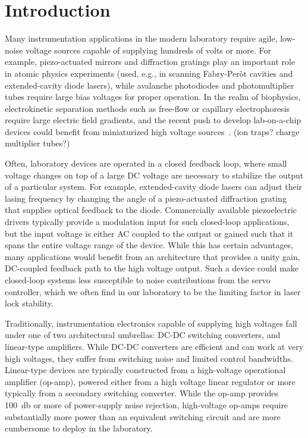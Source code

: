 \documentclass[aip,rsi,reprint]{revtex4-1} %
\begin{document}
\section{Introduction}
\label{Sec:Introduction}

Many instrumentation applications in the modern laboratory require agile, low-noise voltage sources capable of supplying hundreds of volts or more.
For example, piezo-actuated mirrors and diffraction gratings play an important role in atomic physics experiments (used, e.g., in scanning Fabry-Per{\`o}t cavities and extended-cavity diode lasers), while avalanche photodiodes and photomultiplier tubes require large bias voltages for proper operation. 
In the realm of biophysics, electrokinetic separation methods such as free-flow or capillary electrophoresis require large electric field gradients, and the recent push to develop lab-on-a-chip devices could benefit from miniaturized high voltage sources~\cite{Kohlheyer2008a}. (ion traps? charge multiplier tubes?)

Often, laboratory devices are operated in a closed feedback loop, where small voltage changes on top of a large DC voltage are necessary to stabilize the output of a particular system.
For example, extended-cavity diode lasers can adjust their lasing frequency by changing the angle of a piezo-actuated diffraction grating that supplies optical feedback to the diode.
Commercially available piezoelectric drivers typically provide a modulation input for  such closed-loop applications, but the input voltage is either AC coupled to the output or gained such that it spans the entire voltage range of the device.
While this has certain advantages, many applications would benefit from an architecture that provides a unity gain, DC-coupled feedback path to the high voltage output. 
Such a device could make closed-loop systems less susceptible to noise contributions from the servo controller, which we often find in our laboratory to be the limiting factor in laser lock stability.

Traditionally, instrumentation electronics capable of supplying high voltages fall under one of two architectural umbrellas: DC-DC switching converters, and linear-type amplifiers.
While DC-DC converters are efficient and can work at very high voltages, they suffer from switching noise and limited control bandwidths.
Linear-type devices are typically constructed from a high-voltage operational amplifier (op-amp), powered either from a high voltage linear regulator or more typically from a secondary switching converter.
While the op-amp provides \SI{100}{\decibel} or more of power-supply noise rejection, high-voltage op-amps require substantially more power than an equivalent switching circuit and are more cumbersome to deploy in the laboratory.
\end{document}
